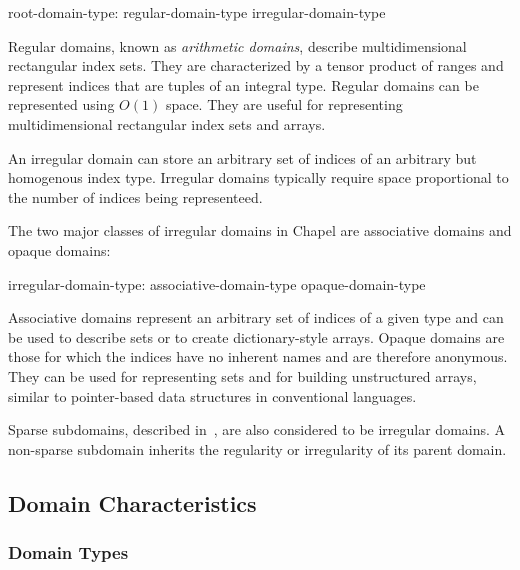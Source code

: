 \begin{syntax}
root-domain-type:
  regular-domain-type
  irregular-domain-type
\end{syntax}

Regular domains, known as \emph{arithmetic domains}, describe
multidimensional rectangular index sets.  They are characterized by a
tensor product of ranges and represent indices that are tuples of an
integral type.  Regular domains can be represented using $O(1)$ space.
They are useful for representing multidimensional rectangular index
sets and arrays.


An irregular domain can store an arbitrary set of indices of an
arbitrary but homogenous index type.  Irregular domains typically
require space proportional to the number of indices being
representeed.


The two major classes of irregular domains in Chapel are associative
domains and opaque domains:

\begin{syntax}
irregular-domain-type:
  associative-domain-type
  opaque-domain-type
\end{syntax}

\noindent Associative domains represent an arbitrary set of indices
of a given type and can be used to describe sets or to create
dictionary-style arrays.  Opaque domains are those for which the
indices have no inherent names and are therefore anonymous.  They can
be used for representing sets and for building unstructured arrays,
similar to pointer-based data structures in conventional languages.

Sparse subdomains, described in~, are also
considered to be irregular domains.  A non-sparse subdomain inherits
the regularity or irregularity of its parent domain.


\subsection{Domain Characteristics}
\label{Domain_Characteristics}

\subsubsection{Domain Types}
\label{Domain_Types}

